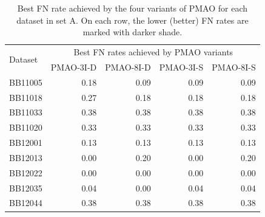 \begin{table}[!htbp]
	\caption{Best FN rate achieved by the four variants of PMAO for each dataset in set A. On each row, the lower (better) FN rates are marked with darker shade.}
	\begin{tabular}{|l|r|r|r|r|}
		\hline
		\multirow{2}{*}{Dataset} & \multicolumn{4}{c|}{Best FN rates achieved by PMAO variants} \\
		\cline{2-5}          & PMAO-3I-D & PMAO-8I-D & PMAO-3I-S & PMAO-8I-S \\
		\hline
		BB11005 & \cellcolor[rgb]{ .988,  1,  .992}0.18 & \cellcolor[rgb]{ .384,  .745,  .478}0.09 & \cellcolor[rgb]{ .384,  .745,  .478}0.09 & \cellcolor[rgb]{ .384,  .745,  .478}0.09 \\
		\hline
		BB11018 & \cellcolor[rgb]{ .988,  1,  .992}0.27 & \cellcolor[rgb]{ .384,  .745,  .478}0.18 & \cellcolor[rgb]{ .384,  .745,  .478}0.18 & \cellcolor[rgb]{ .384,  .745,  .478}0.18 \\
		\hline
		BB11033 & \cellcolor[rgb]{ .988,  1,  .992}0.38 & \cellcolor[rgb]{ .988,  1,  .992}0.38 & \cellcolor[rgb]{ .988,  1,  .992}0.38 & \cellcolor[rgb]{ .988,  1,  .992}0.38 \\
		\hline
		BB11020 & \cellcolor[rgb]{ .988,  1,  .992}0.33 & \cellcolor[rgb]{ .988,  1,  .992}0.33 & \cellcolor[rgb]{ .988,  1,  .992}0.33 & \cellcolor[rgb]{ .988,  1,  .992}0.33 \\
		\hline
		BB12001 & \cellcolor[rgb]{ .988,  1,  .992}0.13 & \cellcolor[rgb]{ .988,  1,  .992}0.13 & \cellcolor[rgb]{ .988,  1,  .992}0.13 & \cellcolor[rgb]{ .988,  1,  .992}0.13 \\
		\hline
		BB12013 & \cellcolor[rgb]{ .384,  .745,  .478}0.00 & \cellcolor[rgb]{ .988,  1,  .992}0.20 & \cellcolor[rgb]{ .384,  .745,  .478}0.00 & \cellcolor[rgb]{ .988,  1,  .992}0.20 \\
		\hline
		BB12022 & \cellcolor[rgb]{ .988,  1,  .992}0.00 & \cellcolor[rgb]{ .988,  1,  .992}0.00 & \cellcolor[rgb]{ .988,  1,  .992}0.00 & \cellcolor[rgb]{ .988,  1,  .992}0.00 \\
		\hline
		BB12035 & \cellcolor[rgb]{ .988,  1,  .992}0.04 & \cellcolor[rgb]{ .384,  .745,  .478}0.00 & \cellcolor[rgb]{ .988,  1,  .992}0.04 & \cellcolor[rgb]{ .988,  1,  .992}0.04 \\
		\hline
		BB12044 & \cellcolor[rgb]{ .988,  1,  .992}0.38 & \cellcolor[rgb]{ .988,  1,  .992}0.38 & \cellcolor[rgb]{ .988,  1,  .992}0.38 & \cellcolor[rgb]{ .988,  1,  .992}0.38 \\

\end{tabular}
\end{table}

